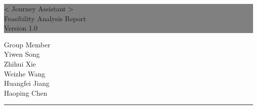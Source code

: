 \documentclass[10pt]{article}
\begin{document}

\begin{titlepage} %
	
	
	\colorbox{grey}{
		\parbox[t]{1.1\textwidth}{ %
			\parbox[t]{1.02\textwidth}{ %
				\raggedleft %
				\fontsize{34pt}{40pt}\selectfont %
				\vspace{0.7cm} %
				
				< Journey Assistant >\\
              Feasibility Analysis Report\\
                Version 1.0\\
				
				\vspace{0.7cm} %
			}
		}
	}
	
	\vfill %
	
	
	\parbox[t]{1\textwidth}{ %
		\raggedleft %
		\large %
		{\Large Group Member}\\[4pt] %
        Yiwen Song\\
        Zhihui Xie\\
        Weizhe Wang\\
        Huangfei Jiang\\
        Haoping Chen\\
		
		\hfill\rule{0.2\linewidth}{1pt}%
    }
    
	
\end{titlepage}
\end{document}
